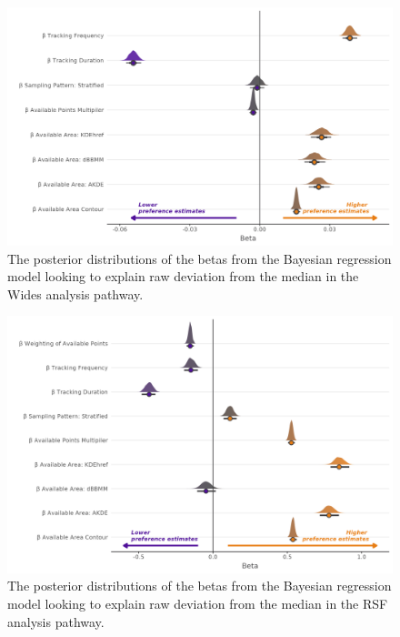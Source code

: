 \documentclass[10pt,a4paper]{article}
\begin{document}
\begin{figure}
\includegraphics[width=1\linewidth]{../figures/wides_rEstWides_effectsPlot} \caption{The posterior distributions of the betas from the Bayesian regression model looking to explain raw deviation from the median in the Wides analysis pathway.}\label{fig:rEstBetasWides}
\end{figure}

\begin{figure}
\includegraphics[width=1\linewidth]{../figures/rsf_rEstRSF_effectsPlot} \caption{The posterior distributions of the betas from the Bayesian regression model looking to explain raw deviation from the median in the RSF analysis pathway.}\label{fig:rEstBetasRSF}
\end{figure}
\end{document}
